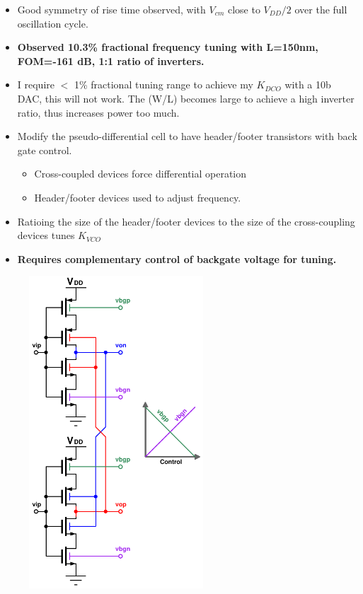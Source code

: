 			\begin{itemize}[itemsep=4pt,label=\protect---]
				\item Good symmetry of rise time observed, with $V_{cm}$ close to $V_{DD}/2$ over the full oscillation cycle.
				\item \textbf{Observed 10.3\% fractional frequency tuning with L=150nm, FOM=-161 dB, 1:1 ratio of inverters.}
				\item I require $<$ 1\% fractional tuning range to achieve my $K_{DCO}$ with a 10b DAC, this will not work. The (W/L) becomes large to achieve a high inverter ratio, thus increases power too much.
			\end{itemize}



			\begin{itemize}[itemsep=4pt,label=\protect---]
				\item Modify the pseudo-differential cell to have header/footer transistors with back gate control.
				\begin{itemize}[itemsep=4pt,label=$\bullet$]
					\item Cross-coupled devices force differential operation
					\item Header/footer devices used to adjust frequency.
				\end{itemize}				
				\item Ratioing the size of the header/footer devices to the size of the cross-coupling devices tunes $K_{VCO}$
				\item \textbf{Requires complementary control of backgate voltage for tuning.}
			\end{itemize}

			\begin{figure}[htb!]
			        \centering
			        \includegraphics[width=0.58\textwidth, angle=0]{./figs/tele_delay_cell}
			\end{figure}


